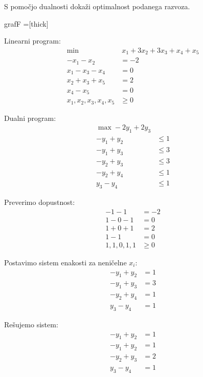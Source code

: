\documentclass[14pt]{extarticle}
\begin{document}
S pomočjo dualnosti dokaži optimalnost podanega razvoza.

\begin{razvoz}{grafF}
    =[thick]


\end{razvoz}

Linearni program:
\begin{align*}
    \min &\ x_1 + 3 x_2 + 3 x_3 + x_4 + x_5 \\
    -x_1 - x_2 &= -2 \\
    x_1 - x_3 - x_4 &= 0 \\
    x_2 + x_3 + x_5 &= 2 \\
    x_4 - x_5 &= 0 \\
    x_1, x_2, x_3, x_4, x_5 &\ge 0
\end{align*}

Dualni program:
\begin{align*}
    \max -2 y_1 + 2 y_3 \\
    -y_1 + y_2 &\le 1 \\
    -y_1 + y_3 &\le 3 \\
    -y_2 + y_3 &\le 3 \\
    -y_2 + y_4 &\le 1 \\
     y_3 - y_4 &\le 1
\end{align*}

Preverimo dopustnost:
\begin{align*}
    -1 - 1 &= -2 \\
    1 - 0 - 1 &= 0 \\
    1 + 0 + 1 &= 2 \\
    1 - 1 &= 0 \\
    1, 1, 0, 1, 1 &\ge 0
\end{align*}

Postavimo sistem enakosti za neničelne $x_i$:
\begin{align*}
    -y_1 + y_2 &= 1 \\
    -y_1 + y_3 &= 3 \\
    -y_2 + y_4 &= 1 \\
     y_3 - y_4 &= 1
\end{align*}

Rešujemo sistem:
\begin{align*}
    -y_1 + y_2 &= 1 \\
    -y_1 + y_2 &= 1 \\
    -y_2 + y_3 &= 2 \\
     y_3 - y_4 &= 1
\end{align*}
\end{document}
